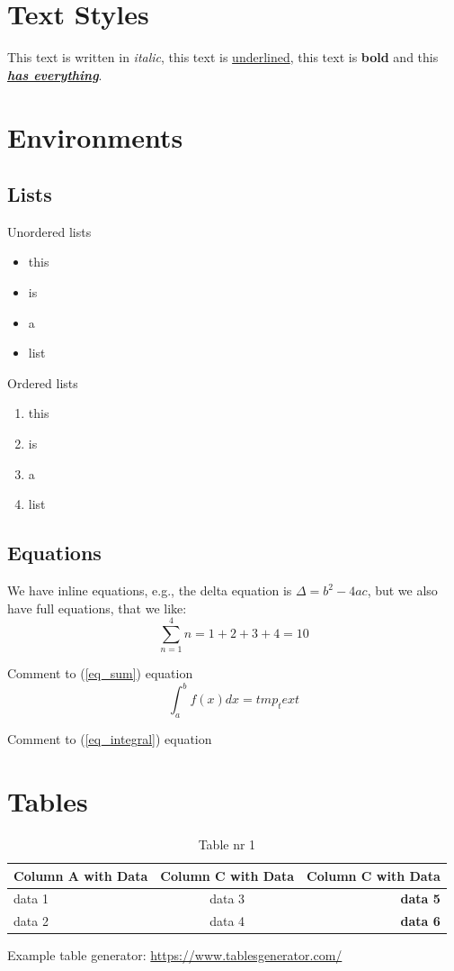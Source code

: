 \documentclass{article}
\begin{document}
\section{Text Styles}
This text is written in \textit{italic}, this text is \underline{underlined}, this text is \textbf{bold} and this \textbf{\textit{\underline{has everything}}}.

\section{Environments}
\subsection{Lists}
Unordered lists
\begin{itemize}
    \item this
    \item is
    \item a 
    \item list
\end{itemize}
Ordered lists
\begin{enumerate}
    \item this
    \item is
    \item a 
    \item list
\end{enumerate}

\subsection{Equations}
We have inline equations, e.g., the delta equation is $\Delta=b^2-4ac$, but we also have full equations, that we like:
\begin{equation}
    \label{eq_sum}
    \sum_{n=1}^{4} n = 1 + 2 + 3 + 4 = 10 
\end{equation}

Comment to (\ref{eq_sum}) equation
\begin{equation}
    \int_{a}^b f(x)dx = tmp_text
    \label{eq_integral}
\end{equation}

Comment to (\ref{eq_integral}) equation

\section{Tables}

\begin{table}[H]
    \centering
    \begin{tabular}{|l|c|r|}
    \hline
    Column A with Data & Column C with Data & \textbf{Column C with Data} \\ \hline
    data 1             & data 3             & \textbf{data 5}             \\ \hline
    data 2             & data 4             & \textbf{data 6}             \\ \hline
    \end{tabular}
    \caption{Table nr 1}
\end{table}
Example table generator: \url{https://www.tablesgenerator.com/}
\end{document}
